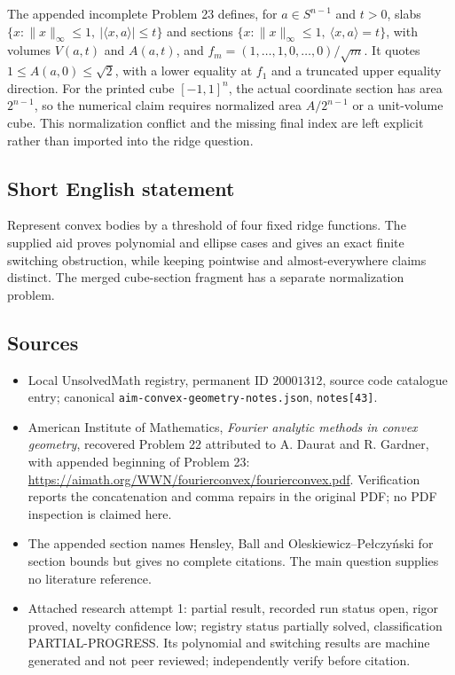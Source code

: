 \documentclass[11pt]{article}
\begin{document}
The appended incomplete Problem 23 defines, for $a\in S^{n-1}$ and $t>0$, slabs $\{x:\|x\|_\infty\le1,\ |\langle x,a\rangle|\le t\}$ and sections $\{x:\|x\|_\infty\le1,\ \langle x,a\rangle=t\}$, with volumes $V(a,t)$ and $A(a,t)$, and $f_m=(1,\ldots,1,0,\ldots,0)/\sqrt m$. It quotes $1\le A(a,0)\le\sqrt2$, with a lower equality at $f_1$ and a truncated upper equality direction. For the printed cube $[-1,1]^n$, the actual coordinate section has area $2^{n-1}$, so the numerical claim requires normalized area $A/2^{n-1}$ or a unit-volume cube. This normalization conflict and the missing final index are left explicit rather than imported into the ridge question.
\subsection{Short English statement}
Represent convex bodies by a threshold of four fixed ridge functions. The supplied aid proves polynomial and ellipse cases and gives an exact finite switching obstruction, while keeping pointwise and almost-everywhere claims distinct. The merged cube-section fragment has a separate normalization problem.
\subsection{Sources}
\begin{itemize}
\item Local UnsolvedMath registry, permanent ID $20001312$, source code catalogue entry; canonical \texttt{aim-convex-geometry-notes.json}, \texttt{notes[43]}.
\item American Institute of Mathematics, \emph{Fourier analytic methods in convex geometry}, recovered Problem 22 attributed to A. Daurat and R. Gardner, with appended beginning of Problem 23: \url{https://aimath.org/WWN/fourierconvex/fourierconvex.pdf}. Verification reports the concatenation and comma repairs in the original PDF; no PDF inspection is claimed here.
\item The appended section names Hensley, Ball and Oleskiewicz--Pe\l czy\'nski for section bounds but gives no complete citations. The main question supplies no literature reference.
\item Attached research attempt 1: partial result, recorded run status open, rigor proved, novelty confidence low; registry status partially solved, classification PARTIAL-PROGRESS. Its polynomial and switching results are machine generated and not peer reviewed; independently verify before citation.
\end{itemize}
\end{document}
